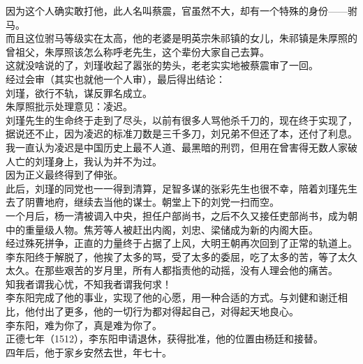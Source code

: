 \begin{multicols}{\theparacolNo}
因为这个人确实敢打他，此人名叫蔡震，官虽然不大，却有一个特殊的身份——驸马。\\

而且这位驸马等级实在太高，他的老婆是明英宗朱祁镇的女儿，朱祁镇是朱厚照的曾祖父，朱厚照该怎么称呼老先生，这个辈份大家自己去算。\\

这就没啥说的了，刘瑾收起了嚣张的势头，老老实实地被蔡震审了一回。\\

经过会审（其实也就他一个人审），最后得出结论：\\

刘瑾，欲行不轨，谋反罪名成立。\\

朱厚照批示处理意见：凌迟。\\

刘瑾先生的生命终于走到了尽头，以前有很多人骂他杀千刀的，现在终于实现了，据说还不止，因为凌迟的标准刀数是三千多刀，刘兄弟不但还了本，还付了利息。\\

我一直认为凌迟是中国历史上最不人道、最黑暗的刑罚，但用在曾害得无数人家破人亡的刘瑾身上，我认为并不为过。\\

因为正义最终得到了伸张。\\

此后，刘瑾的同党也一一得到清算，足智多谋的张彩先生也很不幸，陪着刘瑾先生去了阴曹地府，继续去当他的谋士。朝堂上下的刘党一扫而空。\\

一个月后，杨一清被调入中央，担任户部尚书，之后不久又接任吏部尚书，成为朝中的重量级人物。焦芳等人被赶出内阁，刘忠、梁储成为新的内阁大臣。\\

经过殊死拼争，正直的力量终于占据了上风，大明王朝再次回到了正常的轨道上。\\

李东阳终于解脱了，他挨了太多的骂，受了太多的委屈，吃了太多的苦，等了太久太久。在那些艰苦的岁月里，所有人都指责他的动摇，没有人理会他的痛苦。\\

知我者谓我心忧，不知我者谓我何求！\\

李东阳完成了他的事业，实现了他的心愿，用一种合适的方式。与刘健和谢迁相比，他付出了更多，他的一切行为都对得起自己，对得起天地良心。\\

李东阳，难为你了，真是难为你了。\\

正德七年（1512），李东阳申请退休，获得批准，他的位置由杨廷和接替。\\

四年后，他于家乡安然去世，年七十。\\
\ifnum{}
	\end{multicols}
\fi
\newpage
